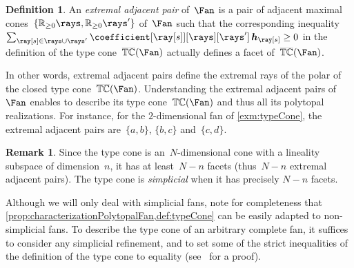 \documentclass{amsart}
\theoremstyle{definition}
\newtheorem{definition}[theorem]{Definition}
\newtheorem{remark}[theorem]{Remark}
\newcommand{\R}{\mathbb{R}} %
\renewcommand{\b}[1]{{\boldsymbol{#1}}} %
\newcommand{\darkblue}{\color{darkblue}} %
\newcommand{\defn}[1]{\textsl{\darkblue #1}} %
\newcommand{\typeCone}{\mathbb{TC}} %
\newcommand{\ctypeCone}{\smash{\overline{\mathbb{TC}}}} %
\begin{document}
\begin{definition}
An \defn{extremal adjacent pair} of~$\Fan$ is a pair of adjacent maximal cones~$\{\R_{\ge0}\rays, \R_{\ge0}\rays'\}$ of~$\Fan$ such that the corresponding inequality $\sum_{\ray[s] \in \rays \cup \rays'} \coefficient[{\ray[s]}][\rays][\rays'] \, \b{h}_{\ray[s]} \ge 0$ in the definition of the type cone~$\ctypeCone(\Fan)$ actually defines a facet of~$\ctypeCone(\Fan)$.
\end{definition}

In other words, extremal adjacent pairs define the extremal rays of the polar of the closed type cone~$\ctypeCone(\Fan)$.
Understanding the extremal adjacent pairs of~$\Fan$ enables to describe its type cone~$\typeCone(\Fan)$ and thus all its polytopal realizations.
For instance, for the $2$-dimensional fan of \cref{exm:typeCone}, the extremal adjacent pairs are~$\{a,b\}$, $\{b,c\}$ and~$\{c,d\}$.

\begin{remark}
\label{rem:dimTypeCone}
Since the type cone is an~$N$-dimensional cone with a lineality subspace of dimension~$n$, it has at least~$N-n$ facets (thus~$N-n$ extremal adjacent pairs).
The type cone is \defn{simplicial} when it has precisely $N-n$ facets.
\end{remark}

Although we will only deal with simplicial fans, note for completeness that \cref{prop:characterizationPolytopalFan,def:typeCone} can be easily adapted to non-simplicial fans. To describe the type cone of an arbitrary complete fan, it suffices to consider any simplicial refinement, and to set some of the strict inequalities of the definition of the type cone to equality (see~\cite[Prop.~3]{PilaudSantos-quotientopes} for a proof).
\end{document}
